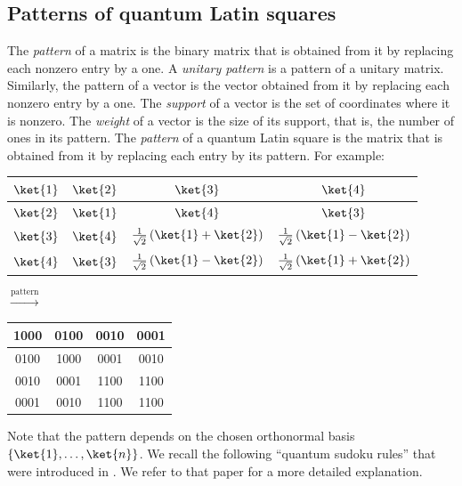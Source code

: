 \documentclass[a4paper]{article}
\theoremstyle{definition}
\begin{document}
\subsection{Patterns of quantum Latin squares}

The \emph{pattern} of a matrix is the binary matrix that is obtained from it by replacing each nonzero entry by a one.
A \emph{unitary pattern} is a pattern of a unitary matrix.
Similarly, the pattern of a vector is the vector obtained from it by replacing each nonzero entry by a one.
The \emph{support} of a vector is the set of coordinates where it is nonzero.
The \emph{weight} of a vector is the size of its support, that is, the number of ones in its pattern.
The \emph{pattern} of a quantum Latin square is the matrix that is obtained from it by replacing each entry by its pattern.
For example:

\begin{table}[H]
    \centering
\begin{tabular}{|c|c|c|c|}
    \hline
    \(\ket{1}\) & \(\ket{2}\) & \(\ket{3}\) & \(\ket{4}\)\\
    \hline
    \(\ket{2}\) & \(\ket{1}\) & \(\ket{4}\) & \(\ket{3}\)\\
    \hline
    \(\ket{3}\) & \(\ket{4}\) & \(\frac1{\sqrt{2}}\left(\ket{1}+\ket{2}\right)\) & \(\frac1{\sqrt{2}}\left(\ket{1}-\ket{2}\right)\)\\
    \hline
    \(\ket{4}\) & \(\ket{3}\) & \(\frac1{\sqrt{2}}\left(\ket{1}-\ket{2}\right)\) & \(\frac1{\sqrt{2}}\left(\ket{1}+\ket{2}\right)\)\\
    \hline
\end{tabular}
\quad
\(\xrightarrow{\text{pattern}}\)
\quad
\begin{tabular}{|c|c|c|c|}
    \hline
    1000 & 0100 & 0010 & 0001\\
    \hline
    0100 & 1000 & 0001 & 0010\\
    \hline
    0010 & 0001 & 1100 & 1100\\
    \hline
    0001 & 0010 & 1100 & 1100\\
    \hline
\end{tabular}
\end{table}

Note that the pattern depends on the chosen orthonormal basis \(\left\{\ket{1},\dots,\ket{n}\right\}\).
We recall the following ``quantum sudoku rules'' that were introduced in \cite{36paper}. We refer to that paper for a more detailed explanation.
\end{document}
